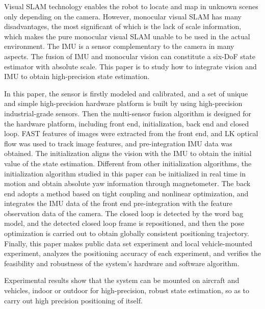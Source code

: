 \begin{englishabstract}

   Visual SLAM technology enables the robot to locate and map in unknown scenes only depending on the camera. However, monocular visual SLAM has many disadvantages, the most significant of which is the lack of scale information, which makes the pure monocular visual SLAM unable to be used in the actual environment. The IMU is a sensor complementary to the camera in many aspects. The fusion of IMU and monocular vision can constitute a six-DoF state estimator with absolute scale. This paper is to study how to integrate vision and IMU to obtain high-precision state estimation.
   
   In this paper, the sensor is firstly modeled and calibrated, and a set of unique and simple high-precision hardware platform is built by using high-precision industrial-grade sensors. Then the multi-sensor fusion algorithm is designed for the hardware platform, including front end, initialization, back end and closed loop. FAST features of images were extracted from the front end, and LK optical flow was used to track image features, and pre-integration IMU data was obtained. The initialization aligns the vision with the IMU to obtain the initial value of the state estimation. Different from other initialization algorithms, the initialization algorithm studied in this paper can be initialized in real time in motion and obtain absolute yaw information through magnetometer. The back end adopts a method based on tight coupling and nonlinear optimization, and integrates the IMU data of the front end pre-integration with the feature observation data of the camera. The closed loop is detected by the word bag model, and the detected closed loop frame is repositioned, and then the pose optimization is carried out to obtain globally consistent positioning trajectory. Finally, this paper makes public data set experiment and local vehicle-mounted experiment, analyzes the positioning accuracy of each experiment, and verifies the feasibility and robustness of the system's hardware and software algorithm.
   
   Experimental results show that the system can be mounted on aircraft and vehicles, indoor or outdoor for high-precision, robust state estimation, so as to carry out high precision positioning of itself.
   


\end{englishabstract}
